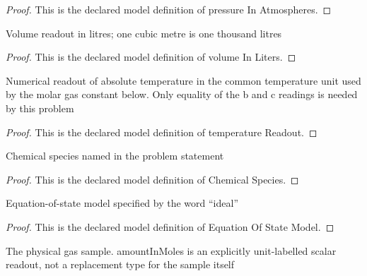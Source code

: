 \begin{proof}
  This is the declared model definition of pressure In Atmospheres.
\end{proof}
\begin{definition}
  \label{def:physics:phyx-mini-0343:phyxminiproblems-problemphyxmini0343-volumeinliters}
  Volume readout in litres; one cubic metre is one thousand litres
\end{definition}
\begin{proof}
  This is the declared model definition of volume In Liters.
\end{proof}
\begin{definition}
  \label{def:physics:phyx-mini-0343:phyxminiproblems-problemphyxmini0343-temperaturereadout}
  Numerical readout of absolute temperature in the common temperature unit used by the molar gas constant below. Only equality of the b and c readings is needed by this problem
\end{definition}
\begin{proof}
  This is the declared model definition of temperature Readout.
\end{proof}
\begin{definition}
  \label{def:physics:phyx-mini-0343:phyxminiproblems-problemphyxmini0343-chemicalspecies}
  Chemical species named in the problem statement
\end{definition}
\begin{proof}
  This is the declared model definition of Chemical Species.
\end{proof}
\begin{definition}
  \label{def:physics:phyx-mini-0343:phyxminiproblems-problemphyxmini0343-equationofstatemodel}
  Equation-of-state model specified by the word “ideal”
\end{definition}
\begin{proof}
  This is the declared model definition of Equation Of State Model.
\end{proof}
\begin{definition}
  \label{def:physics:phyx-mini-0343:phyxminiproblems-problemphyxmini0343-gassample}
  The physical gas sample. amountInMoles is an explicitly unit-labelled scalar readout, not a replacement type for the sample itself
\end{definition}

